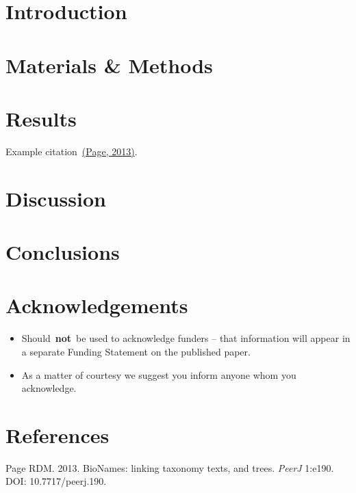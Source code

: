\documentclass[10pt]{article}
\providecommand{\tightlist}{\setlength{\itemsep}{0pt}\setlength{\parskip}{0pt}}%
\begin{document}
\section*{Introduction}

{\label{412282}}

\section*{Materials \& Methods}

{\label{888004}}

\section*{Results}

{\label{423102}}

Example citation~\hyperref[csl:1]{(Page, 2013)}.

\section*{Discussion}

{\label{700159}}\par\null

\section*{Conclusions}

{\label{243277}}\par\null

\section*{Acknowledgements}

{\label{632014}}

\begin{itemize}
\tightlist
\item
  Should~\textbf{not}~be used to acknowledge funders -- that information
  will appear in a separate Funding Statement on the published paper.
\item
  As a matter of courtesy we suggest you inform anyone whom you
  acknowledge.
\end{itemize}

\FloatBarrier
\section*{References}\sloppy
{}
\label{csl:1}Page RDM. 2013. {{BioNames}: linking taxonomy texts, and trees}. \textit{{PeerJ}} 1:e190. DOI: 10.7717/peerj.190.
\end{document}
